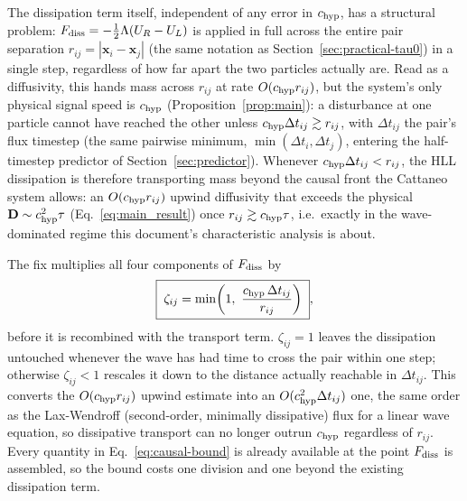\documentclass[11pt, a4paper, parskip]{scrartcl}
\newcommand{\code}[1]{\texttt{\seqsplit{#1}}}
\theoremstyle{plain}
\theoremstyle{definition}
\theoremstyle{remark}
\newcommand{\dt}{\Delta t}                                %
\newcommand{\chyp}{c_{\rm hyp}}                           %
\newcommand{\taurelax}{\tau}                              %
\newcommand{\Deff}{\mathbf{D}}                            %
\begin{document}
The dissipation term itself, independent of any error in $\chyp$, has a
structural problem: $F_{\rm diss}=-\tfrac12\Lambda(U_R-U_L)$ is applied in
full across the entire pair separation
$r_{ij}=|\mathbf x_i-\mathbf x_j|$ (the same notation as
Section~\ref{sec:practical-tau0}) in a single step, regardless of how far
apart the two particles actually are. Read as a diffusivity, this hands
mass across $r_{ij}$ at rate $O(\chyp r_{ij})$, but the system's only
physical signal speed is $\chyp$ (Proposition~\ref{prop:main}): a
disturbance at one particle cannot have reached the other unless
$\chyp\dt_{ij}\gtrsim r_{ij}$, with $\dt_{ij}$ the pair's flux timestep
(the same pairwise minimum, $\min(\dt_i,\dt_j)$, entering the
half-timestep predictor of Section~\ref{sec:predictor}). Whenever
$\chyp\dt_{ij}<r_{ij}$, the HLL dissipation is therefore transporting
mass beyond the causal front the Cattaneo system allows: an $O(\chyp
r_{ij})$ upwind diffusivity that exceeds the physical
$\Deff\sim\chyp^2\taurelax$ (Eq.~\eqref{eq:main_result}) once
$r_{ij}\gtrsim\chyp\taurelax$, i.e.\ exactly in the wave-dominated regime
this document's characteristic analysis is about.

The fix multiplies all four components of $F_{\rm diss}$ by
\begin{equation}
  \label{eq:causal-bound}
  \boxed{\;\zeta_{ij} = \min\!\left(1,\ \frac{\chyp\,\dt_{ij}}{r_{ij}}\right)\;} ,
\end{equation}
before it is recombined with the transport term. $\zeta_{ij}=1$ leaves the
dissipation untouched whenever the wave has had time to cross the pair
within one step; otherwise $\zeta_{ij}<1$ rescales it down to the distance
actually reachable in $\dt_{ij}$. This converts the $O(\chyp r_{ij})$
upwind estimate into an $O(\chyp^2\dt_{ij})$ one, the same order as the
Lax-Wendroff (second-order, minimally dissipative) flux for a linear wave
equation, so dissipative transport can no longer outrun $\chyp$
regardless of $r_{ij}$. Every quantity in Eq.~\eqref{eq:causal-bound} is
already available at the point $F_{\rm diss}$ is assembled, so the bound
costs one division and one \code{min} beyond the existing dissipation
term.
\end{document}

